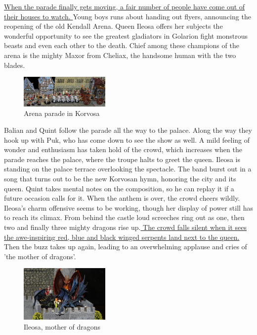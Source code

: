 \hyperref[fig:Arena-parade-in-Korvosa-613132167]{ When the parade finally gets moving, a fair number of people have come out of their houses to watch. } Young boys runs about handing out flyers, announcing the reopening of the old Kendall Arena. Queen Ileosa offers her subjects the wonderful opportunity to see the greatest gladiators in Golarion fight monstrous beasts and even each other to the death. Chief among these champions of the arena is the mighty Maxor from Cheliax, the handsome human with the two blades. \\

\begin{figure}[h]
	\centering
	\includegraphics[width=0.39\textwidth]{images/Arena-parade-in-Korvosa-613132167.jpg}
	\caption{Arena parade in Korvosa}
	\label{fig:Arena-parade-in-Korvosa-613132167}
\end{figure}

Balian and Quint follow the parade all the way to the palace. Along the way they hook up with Puk, who has come down to see the show as well. A mild feeling of wonder and enthusiasm has taken hold of the crowd, which increases when the parade reaches the palace, where the troupe halts to greet the queen. Ileosa is standing on the palace terrace overlooking the spectacle. The band burst out in a song that turns out to be the new Korvosan hymn, honoring the city and its queen. Quint takes mental notes on the composition, so he can replay it if a future occasion calls for it. When the anthem is over, the crowd cheers wildly. Ileosa's charm offensive seems to be working, though her display of power still has to reach its climax. From behind the castle loud screeches ring out as one, then two and finally three mighty dragons rise up.\hyperref[fig:Ileosa-mother-of-dragons-613162775]{ The crowd falls silent when it sees the awe-inspiring red, blue and black winged serpents land next to the queen. } Then the buzz takes up again, leading to an overwhelming applause and cries of 'the mother of dragons'. \\

\begin{figure}[h]
	\centering
	\includegraphics[width=0.39\textwidth]{images/Ileosa-mother-of-dragons-613162775.jpg}
	\caption{Ileosa, mother of dragons}
	\label{fig:Ileosa-mother-of-dragons-613162775}
\end{figure}

